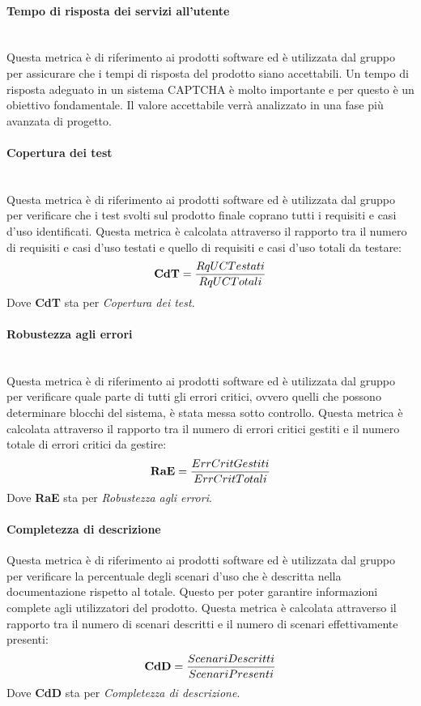 \paragraph{Tempo di risposta dei servizi all'utente}\mbox{}\\
Questa metrica è di riferimento ai prodotti software ed è utilizzata dal gruppo per assicurare che i tempi di risposta del prodotto siano accettabili. Un tempo di risposta adeguato in un sistema CAPTCHA è molto importante e per questo è un obiettivo fondamentale. Il valore accettabile verrà analizzato in una fase più avanzata di progetto.
\paragraph{Copertura dei test}\mbox{}\\
Questa metrica è di riferimento ai prodotti software ed è utilizzata dal gruppo per verificare che i test svolti sul prodotto finale coprano tutti i requisiti e casi d’uso identificati. Questa metrica è calcolata attraverso il rapporto tra il numero di requisiti e casi d'uso testati e quello di requisiti e casi d'uso totali da testare:
\begin{align*}
	\centering
	\textbf{CdT} = \frac{RqUCTestati}{RqUCTotali}
\end{align*}
Dove \textbf{CdT} sta per \textit{Copertura dei test}.
\paragraph{Robustezza agli errori}\mbox{}\\
Questa metrica è di riferimento ai prodotti software ed è utilizzata dal gruppo per verificare quale parte di tutti gli errori critici, ovvero quelli che possono determinare blocchi del sistema, è stata messa sotto controllo. Questa metrica è calcolata attraverso il rapporto tra il numero di errori critici gestiti e il numero totale di errori critici da gestire:
\begin{align*}
	\centering
	\textbf{RaE} = \frac{ErrCritGestiti}{ErrCritTotali}
\end{align*}
Dove \textbf{RaE} sta per \textit{Robustezza agli errori}.
\newpage
\paragraph{Completezza di descrizione}\mbox\\
Questa metrica è di riferimento ai prodotti software ed è utilizzata dal gruppo per verificare la percentuale degli scenari d’uso che è descritta nella documentazione rispetto al totale. Questo per poter garantire informazioni complete agli utilizzatori del prodotto. Questa metrica è calcolata attraverso il rapporto tra il numero di scenari descritti e il numero di scenari effettivamente presenti:
\begin{align*}
	\centering
	\textbf{CdD} = \frac{ScenariDescritti}{ScenariPresenti}
\end{align*}
Dove \textbf{CdD} sta per \textit{Completezza di descrizione}.
